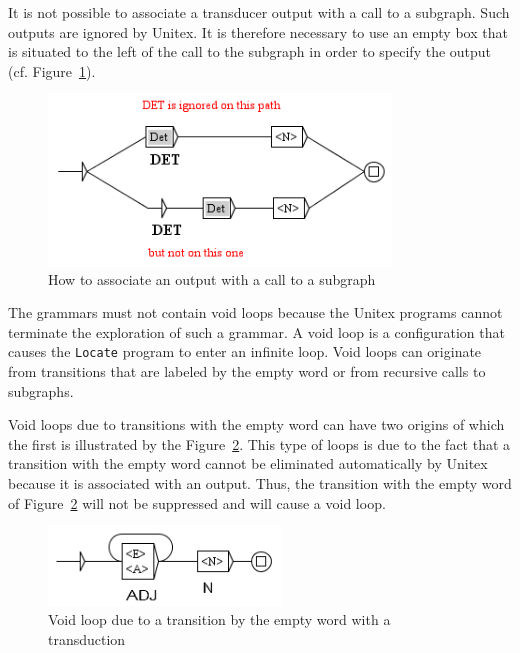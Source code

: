 \bigskip
\noindent It is not possible to associate a transducer output with a call to a
subgraph. Such outputs are ignored by Unitex. It is therefore necessary to use an empty
box that is situated to the left of the call to the subgraph in order to specify the
output (cf. Figure~\ref{fig-subgraph-output}).

\bigskip
\begin{figure}[!h]
\begin{center}
\includegraphics[width=9.1cm]{resources/img/fig6-7.png}
\caption{How to associate an output with a call to a subgraph\label{fig-subgraph-output}}
\end{center}
\end{figure}

\noindent The grammars must not contain void loops because the Unitex programs
cannot terminate the exploration of such a grammar. A void loop is a configuration that
causes the \verb+Locate+ program to enter an infinite loop.
Void loops can originate  from
transitions that are labeled by the empty word or from recursive calls to
subgraphs.

\bigskip
\noindent Void loops due to transitions with the empty word  can have two
origins of which the first is illustrated by the 
Figure~\ref{fig-epsilon-output-loop}.
This type of loops is due to the fact that a transition with the
empty word cannot be eliminated automatically by Unitex because it is associated with an
output. Thus, the transition with the empty word of
Figure~\ref{fig-epsilon-output-loop} will not be suppressed
and will cause a void loop.

\begin{figure}[!h]
\begin{center}
\includegraphics[width=6.2cm]{resources/img/fig6-8.png}
\caption{Void loop due to a transition by the empty word with a
transduction\label{fig-epsilon-output-loop}}
\end{center}
\end{figure}

